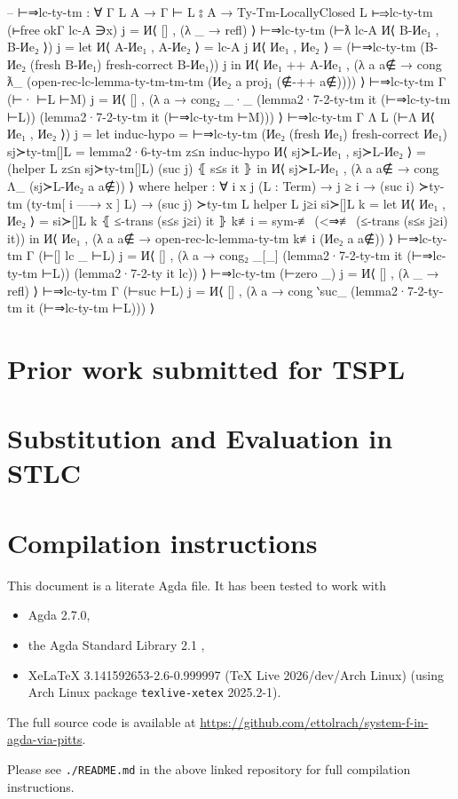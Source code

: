 \documentclass[logo,bsc,singlespacing,parskip,online]{infthesis}
\begin{document}
\begin{code}
  -- ⊢⇒lc-ty-tm : ∀ {Γ L A} → Γ ⊢ L ⦂ A → Ty-Tm-LocallyClosed L
  ⊢⇒lc-ty-tm (⊢free okΓ lc-A ∋x) j = И⟨ [] , (λ _ → refl) ⟩
  ⊢⇒lc-ty-tm (⊢ƛ lc-A И⟨ B-Иe₁ , B-Иe₂ ⟩) j =
    let И⟨ A-Иe₁ , A-Иe₂ ⟩ = lc-A j
        И⟨ Иe₁ , Иe₂ ⟩ = (⊢⇒lc-ty-tm (B-Иe₂ (fresh B-Иe₁) {fresh-correct B-Иe₁})) j
    in И⟨ Иe₁ ++ A-Иe₁ , (λ a {a∉} → cong ƛ_
      (open-rec-lc-lemma-ty-tm-tm-tm (Иe₂ a {proj₁ (∉-++ a∉)}))) ⟩
  ⊢⇒lc-ty-tm {Γ} (⊢· ⊢L ⊢M) j = И⟨ [] , (λ a → cong₂ _·_
    (lemma2·7-2-ty-tm it (⊢⇒lc-ty-tm ⊢L))
    (lemma2·7-2-ty-tm it (⊢⇒lc-ty-tm ⊢M))) ⟩
  ⊢⇒lc-ty-tm {Γ} {Λ L} (⊢Λ И⟨ Иe₁ , Иe₂ ⟩) j =
      let induc-hypo = ⊢⇒lc-ty-tm (Иe₂ (fresh Иe₁) {fresh-correct Иe₁})
          sj≻ty-tm[]L = lemma2·6-ty-tm z≤n induc-hypo
          И⟨ sj≻L-Иe₁ , sj≻L-Иe₂ ⟩ = (helper L z≤n sj≻ty-tm[]L) (suc j) ⦃ s≤s it ⦄
      in И⟨ sj≻L-Иe₁ , (λ a {a∉} → cong Λ_ (sj≻L-Иe₂ a {a∉})) ⟩
    where
      helper : ∀ {i x j} (L : Term) → j ≥ i → (suc i) ≻ty-tm (ty-tm[ i —→ x ] L) → (suc j) ≻ty-tm L
      helper L j≥i si≻[]L k =
        let И⟨ Иe₁ , Иe₂ ⟩ = si≻[]L k ⦃ ≤-trans (s≤s j≥i) it ⦄
            k≢i = sym-≢ (<⇒≢ (≤-trans (s≤s j≥i) it))
        in И⟨ Иe₁ , (λ a {a∉} → open-rec-lc-lemma-ty-tm k≢i (Иe₂ a {a∉})) ⟩
  ⊢⇒lc-ty-tm {Γ} (⊢[] lc _ ⊢L) j = И⟨ [] , (λ a → cong₂ _[_]
    (lemma2·7-2-ty-tm it (⊢⇒lc-ty-tm ⊢L))
    (lemma2·7-2-ty it lc)) ⟩
  ⊢⇒lc-ty-tm (⊢zero _) j = И⟨ [] , (λ _ → refl) ⟩
  ⊢⇒lc-ty-tm {Γ} (⊢suc ⊢L) j = И⟨ [] , (λ a →
    cong ‵suc_ (lemma2·7-2-ty-tm it (⊢⇒lc-ty-tm ⊢L))) ⟩
\end{code}

\chapter{Prior work submitted for TSPL}
\label{appendix:tspl}


\chapter{Substitution and Evaluation in STLC}
\label{appendix:stlc_sub_and_eval}


\chapter{Compilation instructions}
\label{appendix:compilation_instructions}

This document is a literate Agda file. It has been tested to work with
\begin{itemize}
  \item Agda 2.7.0,

  \item the Agda Standard Library 2.1 \citep{the_agda_community_agda_2024},

  \item XeLaTeX 3.141592653-2.6-0.999997 (TeX Live 2026/dev/Arch Linux) (using Arch Linux package
  \texttt{texlive-xetex} 2025.2-1).
\end{itemize}

The full source code is available at \url{https://github.com/ettolrach/system-f-in-agda-via-pitts}.

Please see \texttt{./README.md} in the above linked repository for full compilation instructions.
\end{document}
